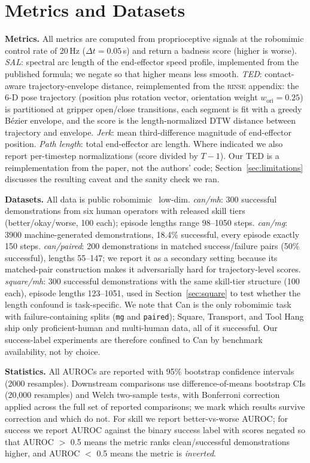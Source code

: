 \documentclass[10pt]{article}
\newcommand{\rinse}{\textsc{rinse}}
\begin{document}
\section{Metrics and Datasets}
\label{sec:setup}

\textbf{Metrics.} All metrics are computed from proprioceptive signals at the
robomimic control rate of 20\,Hz ($\Delta t = 0.05$\,s) and return a badness
score (higher is worse). \emph{SAL}: spectral arc length of the end-effector
speed profile, implemented from the published formula; we negate so that
higher means less smooth. \emph{TED}: contact-aware trajectory-envelope
distance, reimplemented from the \rinse{} appendix: the 6-D pose trajectory
(position plus rotation vector, orientation weight $w_{\mathrm{ori}} =
0.25$) is partitioned at gripper open/close transitions, each segment is fit
with a greedy B\'ezier envelope, and the score is the length-normalized DTW
distance between trajectory and envelope. \emph{Jerk}: mean third-difference
magnitude of end-effector position. \emph{Path length}: total end-effector
arc length. Where indicated we also report per-timestep normalizations
(score divided by $T{-}1$). Our TED is a reimplementation from the paper, not
the authors' code; Section~\ref{sec:limitations} discusses the resulting
caveat and the sanity check we ran.

\textbf{Datasets.} All data is public robomimic~\citep{robomimic} low-dim.
\emph{can/mh}: 300 successful demonstrations from six human operators
with released skill tiers (better/okay/worse, 100 each); episode lengths
range 98--1050 steps. \emph{can/mg}: 3900 machine-generated demonstrations,
18.4\% successful, every episode exactly 150 steps. \emph{can/paired}: 200
demonstrations in matched success/failure pairs (50\% successful), lengths
55--147; we report it as a secondary setting because its matched-pair
construction makes it adversarially hard for trajectory-level scores.
\emph{square/mh}: 300 successful demonstrations with the same skill-tier
structure (100 each), episode lengths 123--1051, used in
Section~\ref{sec:square} to test whether the length confound is
task-specific. We note that Can is the only robomimic task with
failure-containing splits (\texttt{mg} and \texttt{paired}); Square,
Transport, and Tool Hang ship only proficient-human and multi-human data,
all of it successful. Our success-label experiments are therefore confined
to Can by benchmark availability, not by choice.

\textbf{Statistics.} All AUROCs are reported with 95\% bootstrap confidence
intervals (2000 resamples). Downstream comparisons use difference-of-means
bootstrap CIs (20{,}000 resamples) and Welch two-sample tests, with
Bonferroni correction applied across the full set of reported comparisons;
we mark which results survive correction and which do not. For skill we report better-vs-worse AUROC; for
success we report AUROC against the binary success label with scores negated
so that AUROC $>$ 0.5 means the metric ranks clean/successful demonstrations
higher, and AUROC $<$ 0.5 means the metric is \emph{inverted}.
\end{document}
